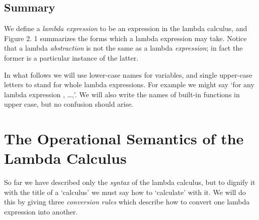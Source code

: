 \subsection{Summary}
We define a \textit{lambda expression} to be an expression in the lambda calculus, and
Figure 2. 1 summarizes the forms which a lambda expression may take. Notice
that a lambda \textit{abstraction} is not the same as a lambda \textit{expression}; in fact the
former is a particular instance of the latter.


In what follows we will use lower-case names for variables, and single
upper-case letters to stand for whole lambda expressions. For example we
might say `for any lambda expression , \dots,'. We will also write the names of
built-in functions in upper case, but no confusion should arise.

\section{The Operational Semantics of the Lambda Calculus}

So far we have described only the \textit{syntax} of the lambda calculus, but to dignify
it with the title of a `calculus' we must say how to `calculate' with it. We will do
this by giving three \textit{conversion rules} which describe how to convert one
lambda expression into another.

